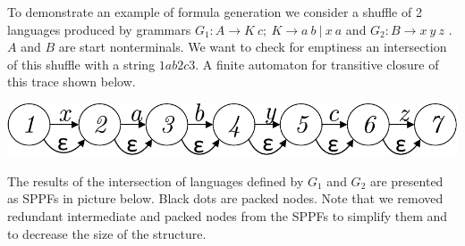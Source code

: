 




To demonstrate an example of formula generation we consider a shuffle of 2 languages 
produced by grammars $G_1: A\rightarrow K\ c;\ K \rightarrow a\ b\ |\ x\ a$ %
and $G_2: B \rightarrow x\ y\ z$ %
. $A$ and $B$ are start nonterminals.
We want to check for emptiness an intersection of this shuffle with a string $1ab2c3$. 
A finite automaton for transitive closure of this trace shown below.

\includegraphics[scale=.54]{./pic/trace2.pdf}

The results of the intersection of languages defined by $G_1$ and $G_2$ are presented as SPPFs in picture
below. Black dots are packed nodes. Note that we removed redundant intermediate and packed nodes from the 
SPPFs to simplify them and to decrease the size of the structure.

